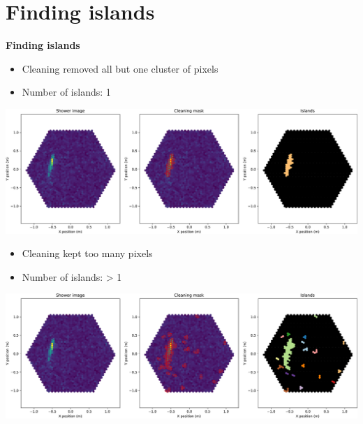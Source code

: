 \section{Finding islands}

\begin{frame}
    \centering
    {\Huge \textbf{Finding islands}}
\end{frame}

\begin{frame}
    \centering
    \begin{itemize}
        \item Cleaning removed all but one cluster of pixels
        \item[\rightarrow] Number of islands: 1
    \end{itemize}
    \vspace{5pt}
    \includegraphics[width=0.85\linewidth]{images/islands_single-crop.pdf}
\end{frame}


\begin{frame}
    \centering
    \begin{itemize}
        \item Cleaning kept too many pixels
        \item[\rightarrow] Number of islands: > 1
    \end{itemize}
    \vspace{5pt}
    \includegraphics[width=0.85\linewidth]{images/islands-crop.pdf}
\end{frame}

